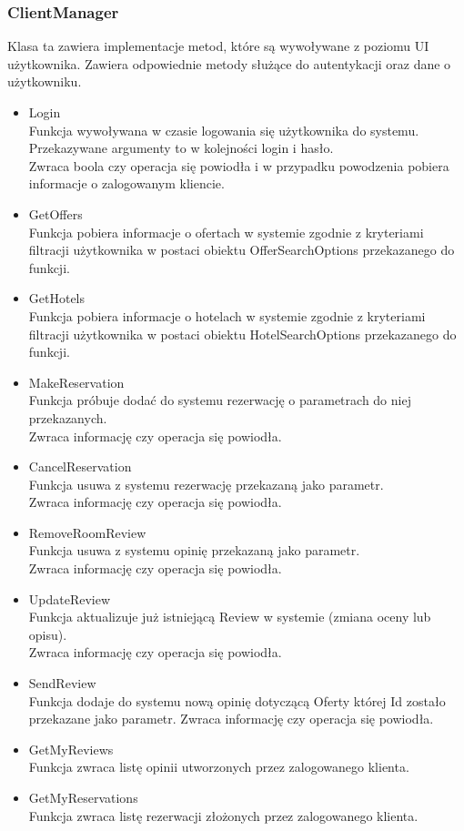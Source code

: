 \documentclass{article}
\begin{document}
\subsubsection{ClientManager}
\indent \indent Klasa ta zawiera implementacje metod, które są wywoływane z poziomu UI użytkownika. Zawiera odpowiednie metody służące do autentykacji oraz dane o użytkowniku.
\begin{itemize}
    \item Login \\
    Funkcja wywoływana w czasie logowania się użytkownika do systemu.
    Przekazywane argumenty to w kolejności login i hasło.\\
    Zwraca boola czy operacja się powiodła i w przypadku powodzenia pobiera informacje o zalogowanym kliencie.
    \item GetOffers\\
    Funkcja pobiera informacje o ofertach w systemie zgodnie z kryteriami filtracji użytkownika w postaci obiektu OfferSearchOptions przekazanego do funkcji.
    \item GetHotels\\
    Funkcja pobiera informacje o hotelach w systemie zgodnie z kryteriami filtracji użytkownika w postaci obiektu HotelSearchOptions przekazanego do funkcji.
    \item MakeReservation\\
    Funkcja próbuje dodać do systemu rezerwację o parametrach do niej przekazanych.\\
    Zwraca informację czy operacja się powiodła.
    \item CancelReservation\\
    Funkcja usuwa z systemu rezerwację przekazaną jako parametr.\\
    Zwraca informację czy operacja się powiodła.
    \item RemoveRoomReview\\
    Funkcja usuwa z systemu opinię przekazaną jako parametr.\\
    Zwraca informację czy operacja się powiodła.
    \item UpdateReview\\
    Funkcja aktualizuje już istniejącą Review w systemie (zmiana oceny lub opisu).\\
    Zwraca informację czy operacja się powiodła.
    \item SendReview\\
    Funkcja dodaje do systemu nową opinię dotyczącą Oferty której Id zostało przekazane jako parametr.
    Zwraca informację czy operacja się powiodła.
    \item GetMyReviews\\
    Funkcja zwraca listę opinii utworzonych przez zalogowanego klienta.
    \item GetMyReservations\\
    Funkcja zwraca listę rezerwacji złożonych przez zalogowanego klienta.
\end{itemize}
\end{document}

